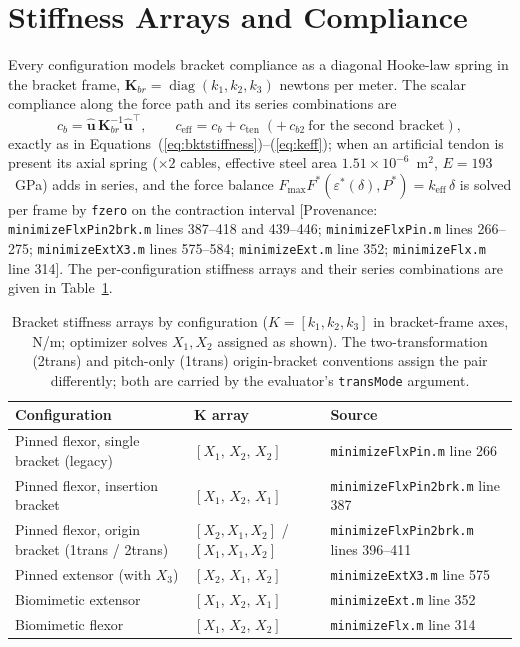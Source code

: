 \section{Stiffness Arrays and Compliance}

Every configuration models bracket compliance as a diagonal Hooke-law spring in the bracket frame, $\mathbf{K}_{br} = \operatorname{diag}(k_{1}, k_{2}, k_{3})$ newtons per meter. The scalar compliance along the force path and its series combinations are
\begin{equation}
    c_{b} = \hat{\mathbf{u}}\,\mathbf{K}_{br}^{-1}\hat{\mathbf{u}}^{\top},
    \qquad
    c_{\text{eff}} = c_{b} + c_{\text{ten}} \;(+\,c_{b2}\ \text{for the second bracket}),
    \label{eq:app_compliance}
\end{equation}
exactly as in Equations~(\ref{eq:bktstiffness})--(\ref{eq:keff}); when an artificial tendon is present its axial spring ($\times2$ cables, effective steel area $1.51\times10^{-6}$~m$^{2}$, $E = 193$~GPa) adds in series, and the force balance $F_{\max}F^{*}(\varepsilon^{*}(\delta), P^{*}) = k_{\text{eff}}\,\delta$ is solved per frame by \texttt{fzero} on the contraction interval [Provenance: \texttt{minimizeFlxPin2brk.m} lines 387--418 and 439--446; \texttt{minimizeFlxPin.m} lines 266--275; \texttt{minimizeExtX3.m} lines 575--584; \texttt{minimizeExt.m} line 352; \texttt{minimizeFlx.m} line 314]. The per-configuration stiffness arrays and their series combinations are given in Table~\ref{tab:app_stiffness_arrays}.

\begin{table}[htbp]
\caption{Bracket stiffness arrays by configuration ($K = [k_{1}, k_{2}, k_{3}]$ in bracket-frame axes, N/m; optimizer solves $X_{1}, X_{2}$ assigned as shown). The two-transformation (2trans) and pitch-only (1trans) origin-bracket conventions assign the pair differently; both are carried by the evaluator's \texttt{transMode} argument.}
\label{tab:app_stiffness_arrays}
\begin{tabular}{@{}lll@{}}
\toprule
\textbf{Configuration} & $\boldsymbol{K}$ array & \textbf{Source} \\
\midrule
Pinned flexor, single bracket (legacy)       & $[X_{1},\,X_{2},\,X_{2}]$ & \texttt{minimizeFlxPin.m} line 266 \\
Pinned flexor, insertion bracket    & $[X_{1},\,X_{2},\,X_{1}]$ & \texttt{minimizeFlxPin2brk.m} line 387 \\
Pinned flexor, origin bracket (1trans / 2trans) & $[X_{2},X_{1},X_{2}]$ / $[X_{1},X_{1},X_{2}]$ & \texttt{minimizeFlxPin2brk.m} lines 396--411 \\
Pinned extensor (with $X_{3}$)      & $[X_{2},\,X_{1},\,X_{2}]$ & \texttt{minimizeExtX3.m} line 575 \\
Biomimetic extensor                 & $[X_{1},\,X_{2},\,X_{1}]$ & \texttt{minimizeExt.m} line 352 \\
Biomimetic flexor                   & $[X_{1},\,X_{2},\,X_{2}]$ & \texttt{minimizeFlx.m} line 314 \\
\bottomrule
\end{tabular}
\end{table}

